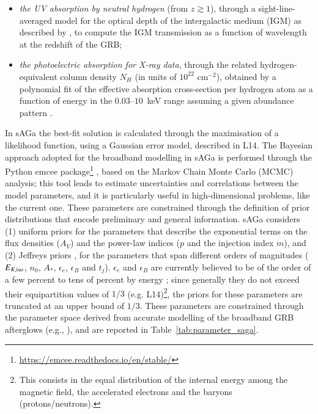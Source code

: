 \documentclass{aa}
\begin{document}
\begin{itemize}
%
\item \textit{the UV absorption by neutral hydrogen} (from $z \gtrsim 1$), through a sight-line-averaged model for the optical depth of the intergalactic medium (IGM) as described by \citet{Madau95}, to compute the IGM transmission as a function of wavelength at the redshift of the GRB;
%
\item \textit{the photoelectric absorption for X-ray data}, through the related hydrogen-equivalent column density $N_H$ (in units of $10^{22}$ cm$^{-2}$), obtained by a polynomial fit of the effective absorption cross-section per hydrogen atom as a function of energy in the $0.03$--$10$~keV range assuming a given abundance pattern \citep{Morrison83}.
\end{itemize}

In {\sc sAGa} the best-fit solution is calculated through the maximisation of a likelihood function, using a Gaussian error model, described in L14.
The Bayesian approach adopted for the broadband modelling in {\sc sAGa} is performed through the Python {\sc emcee} package\footnote{\url{https://emcee.readthedocs.io/en/stable/}} \citep{Foreman13}, based on the Markov Chain Monte Carlo (MCMC) analysis; this tool leads to estimate uncertainties and correlations between the model parameters, and it is particularly useful in high-dimensional problems, like the current one.
These parameters are constrained through the definition of prior distributions that encode preliminary and general information.
{\sc sAGa} considers (1) uniform priors for the parameters that describe the exponential terms on the flux densities ($A_V$) and the power-law indices ($p$ and the injection index $m$), and (2) Jeffreys priors \citep{Jeffreys46}, for the parameters that span different orders of magnitudes ($E_{K,{\rm iso}}$, $n_0$, $A_*$, $\epsilon_e$, $\epsilon_B$ and $t_j$).
$\epsilon_e$ and $\epsilon_B$ are currently believed to be of the order of a few percent to tens of percent by energy \citep{Sironi13}; since generally they do not exceed their equipartition values of $1/3$ (e.g. L14)\footnote{This consists in the equal distribution of the internal energy among the magnetic field, the accelerated electrons and the baryons (protons/neutrons).}, the priors for these parameters are truncated at an upper bound of $1/3$.
These parameters are constrained through the parameter space derived from accurate modelling of the broadband GRB afterglows (e.g., \citealt{Schulze11,Laskar13,Santana14,Perley14,Sironi15b,Laskar16}), and are reported in Table~\ref{tab:parameter_saga}.
\end{document}
